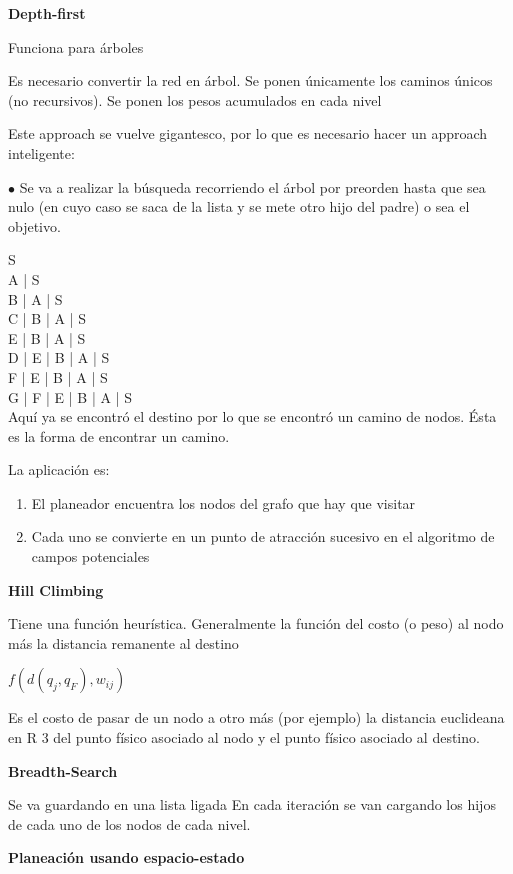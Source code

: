 \textbf{Depth-first}

Funciona para árboles

Es necesario convertir la red en árbol. Se ponen únicamente los caminos únicos (no recursivos).
Se ponen los pesos acumulados en cada nivel

Este approach se vuelve gigantesco, por lo que es necesario hacer un approach inteligente:

$\bullet$	Se va a realizar la búsqueda recorriendo el árbol por preorden hasta que sea nulo (en cuyo caso se
saca de la lista y se mete otro hijo del padre) o sea el objetivo.

S \\
A | S \\
B | A | S \\
C | B | A | S \\
E | B | A | S \\
D | E | B | A | S \\
F | E | B | A | S \\
G | F | E | B | A | S \\ 

Aquí ya se encontró el destino por lo que se encontró un camino de nodos. Ésta es la forma de encontrar un
camino.

La aplicación es:

\begin{enumerate}[1.]
	\item El planeador encuentra los nodos del grafo que hay que visitar	
	\item Cada uno se convierte en un punto de atracción sucesivo en el algoritmo de campos potenciales	
\end{enumerate}



\textbf{Hill Climbing}

Tiene una función heurística.
Generalmente la función del costo (o peso) al nodo más la distancia remanente al destino

$f(d(q_j, q_F), w_{ij})$

Es el costo de pasar de un nodo a otro más (por ejemplo) la distancia euclideana en R 3 del punto físico
asociado al nodo y el punto físico asociado al destino.

\textbf{Breadth-Search}

Se va guardando en una lista ligada
En cada iteración se van cargando los hijos de cada uno de los nodos de cada nivel.

\textbf{Planeación usando espacio-estado}

